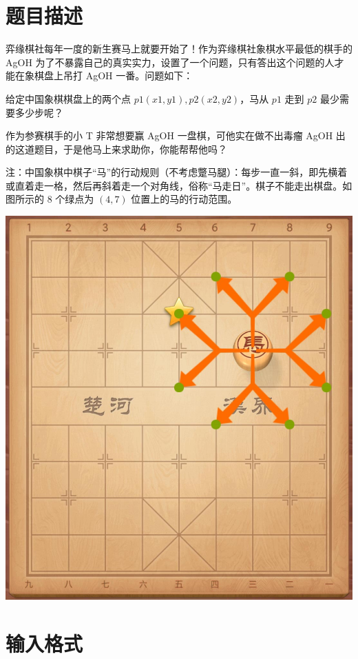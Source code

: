 \documentclass{../cpct/ctpro}
\begin{document}
\makeproblem
\section*{题目描述}

弈缘棋社每年一度的新生赛马上就要开始了！作为弈缘棋社象棋水平最低的棋手的 AgOH 为了不暴露自己的真实实力，设置了一个问题，只有答出这个问题的人才能在象棋盘上吊打 AgOH 一番。问题如下：

给定中国象棋棋盘上的两个点 $p1(x1,y1),p2(x2,y2)$，马从 $p1$ 走到 $p2$ 最少需要多少步呢？

作为参赛棋手的小 T 非常想要赢 AgOH 一盘棋，可他实在做不出毒瘤 AgOH 出的这道题目，于是他马上来求助你，你能帮帮他吗？

注：中国象棋中棋子“马”的行动规则（不考虑蹩马腿）：每步一直一斜，即先横着或直着走一格，然后再斜着走一个对角线，俗称“马走日”。棋子不能走出棋盘。如图所示的 $8$ 个绿点为 $(4,7)$ 位置上的马的行动范围。

\begin{center}
    \includegraphics[scale=0.1]{images/chess.jpg}
\end{center}

\section*{输入格式}
\end{document}
